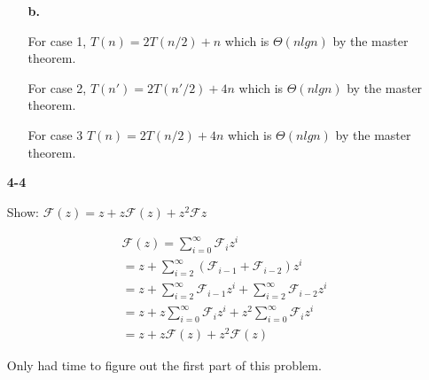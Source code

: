 \documentclass{article}
\begin{document}
\begin{enumerate}
\begin{enumerate}
\item[\textbf{b.}]

For case 1, $T(n) = 2T(n/2) + n$ which is $\Theta(n lg n)$ by the master theorem.

For case 2, $T(n') = 2T(n'/2) + 4n$ which is $\Theta(n lg n)$ by the master theorem.

For case 3 $T(n) = 2T(n/2) + 4n$ which is $\Theta(n lg n)$ by the master theorem.

\end{enumerate}

\item[\textbf{4-4}]

Show: $\mathcal{F}(z) = z + z \mathcal{F}(z) + z^2 \mathcal{F}z$

\begin{align*}
& \mathcal{F}(z) = \sum_{i=0}^\infty \mathcal{F}_i z^i \\
& = z + \sum_{i=2}^\infty (\mathcal{F}_{i-1} + \mathcal{F}_{i-2}) z^i \\
& = z + \sum_{i=2}^\infty \mathcal{F}_{i-1} z^i  + \sum_{i=2}^{\infty} \mathcal{F}_{i-2} z^i \\
& = z + z \sum_{i=0}^\infty \mathcal{F}_{i} z^i  + z^2 \sum_{i=0}^{\infty} \mathcal{F}_{i} z^i \\
& = z + z \mathcal{F}(z) + z^2 \mathcal{F}(z) 
\end{align*}

Only had time to figure out the first part of this problem.

\end{enumerate}
\end{document}
